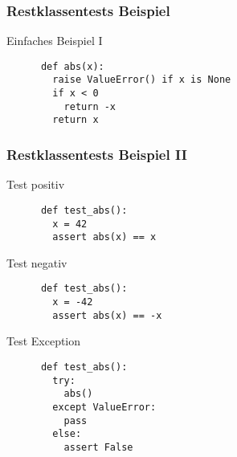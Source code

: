 \begin{frame}[fragile]
  \frametitle{Restklassentests Beispiel}
  \begin{block}{Einfaches Beispiel I}
    \begin{lstlisting}
      def abs(x):
        raise ValueError() if x is None
        if x < 0
          return -x
        return x
    \end{lstlisting}
  \end{block}
\end{frame}

\begin{frame}[fragile]
  \frametitle{Restklassentests Beispiel II}
  \begin{block}{Test positiv}
    \begin{lstlisting}
      def test_abs():
        x = 42
        assert abs(x) == x
    \end{lstlisting}
  \end{block}
  \pause

  \begin{block}{Test negativ}
    \begin{lstlisting}
      def test_abs():
        x = -42
        assert abs(x) == -x
    \end{lstlisting}
  \end{block}
\end{frame}


\begin{frame}[fragile]
  \begin{block}{Test Exception}
    \begin{lstlisting}
      def test_abs():
        try:
          abs()
        except ValueError:
          pass
        else:
          assert False
    \end{lstlisting}
  \end{block}
\end{frame}
